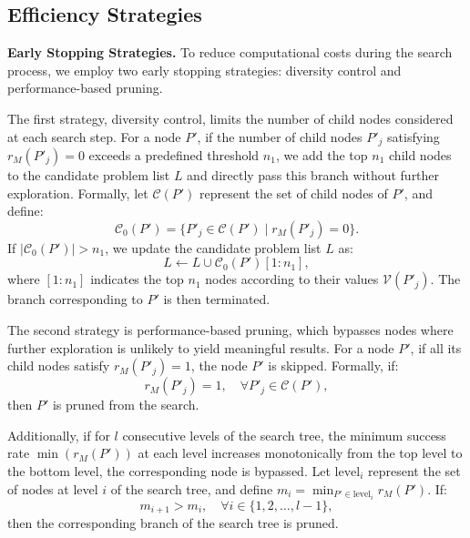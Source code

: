 {%

\subsection{Efficiency Strategies}

\textbf{Early Stopping Strategies.} To reduce computational costs during the search process, we employ two early stopping strategies: diversity control and performance-based pruning.

The first strategy, diversity control, limits the number of child nodes considered at each search step. For a node \( P' \), if the number of child nodes \( P'_j \) satisfying \( r_M(P'_j) = 0 \) exceeds a predefined threshold \( n_1 \), we add the top \( n_1 \) child nodes to the candidate problem list \( L \) and directly pass this branch without further exploration. Formally, let \( \mathcal{C}(P') \) represent the set of child nodes of \( P' \), and define:
\begin{equation}
\mathcal{C}_0(P') = \{P'_j \in \mathcal{C}(P') \mid r_M(P'_j) = 0\}.
\end{equation}
If \( |\mathcal{C}_0(P')| > n_1 \), we update the candidate problem list \( L \) as:
\begin{equation}
L \gets L \cup \mathcal{C}_0(P')[1:n_1],
\end{equation}
where \( [1:n_1] \) indicates the top \( n_1 \) nodes according to their values \( \mathcal{V}(P'_j) \). The branch corresponding to \( P' \) is then terminated.


The second strategy is performance-based pruning, which bypasses nodes where further exploration is unlikely to yield meaningful results. For a node \( P' \), if all its child nodes satisfy \( r_M(P'_j) = 1 \), the node \( P' \) is skipped. Formally, if:
\begin{equation}
r_M(P'_j) = 1, \quad \forall P'_j \in \mathcal{C}(P'),
\end{equation}
then \( P' \) is pruned from the search.



Additionally, if for \( l \) consecutive levels of the search tree, the minimum success rate \( \min(r_M(P')) \) at each level increases monotonically from the top level to the bottom level, the corresponding node is bypassed. Let \( \text{level}_i \) represent the set of nodes at level \( i \) of the search tree, and define $m_i = \min_{P' \in \text{level}_i} r_M(P')$. If:
\begin{equation}
m_{i+1} > m_i, \quad \forall i \in \{1, 2, \dots, l-1\},
\end{equation}
then the corresponding branch of the search tree is pruned.



}
